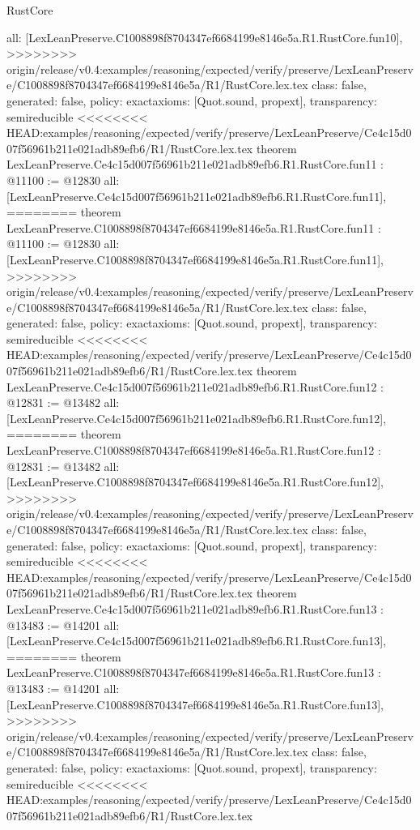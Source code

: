 \begin{lexlean}{RustCore}
\begin{coremodule}
{\begin{coremodule}
{{{{{{{{{{{{{{  all: [LexLeanPreserve.C1008898f8704347ef6684199e8146e5a.R1.RustCore.fun10],
>>>>>>>> origin/release/v0.4:examples/reasoning/expected/verify/preserve/LexLeanPreserve/C1008898f8704347ef6684199e8146e5a/R1/RustCore.lex.tex
  class: false,
  generated: false,
  policy: exact{axioms: [Quot.sound, propext]},
  transparency: semireducible
}
<<<<<<<< HEAD:examples/reasoning/expected/verify/preserve/LexLeanPreserve/Ce4c15d007f56961b211e021adb89efb6/R1/RustCore.lex.tex
theorem LexLeanPreserve.Ce4c15d007f56961b211e021adb89efb6.R1.RustCore.fun11 : @11100 := @12830 {
  all: [LexLeanPreserve.Ce4c15d007f56961b211e021adb89efb6.R1.RustCore.fun11],
========
theorem LexLeanPreserve.C1008898f8704347ef6684199e8146e5a.R1.RustCore.fun11 : @11100 := @12830 {
  all: [LexLeanPreserve.C1008898f8704347ef6684199e8146e5a.R1.RustCore.fun11],
>>>>>>>> origin/release/v0.4:examples/reasoning/expected/verify/preserve/LexLeanPreserve/C1008898f8704347ef6684199e8146e5a/R1/RustCore.lex.tex
  class: false,
  generated: false,
  policy: exact{axioms: [Quot.sound, propext]},
  transparency: semireducible
}
<<<<<<<< HEAD:examples/reasoning/expected/verify/preserve/LexLeanPreserve/Ce4c15d007f56961b211e021adb89efb6/R1/RustCore.lex.tex
theorem LexLeanPreserve.Ce4c15d007f56961b211e021adb89efb6.R1.RustCore.fun12 : @12831 := @13482 {
  all: [LexLeanPreserve.Ce4c15d007f56961b211e021adb89efb6.R1.RustCore.fun12],
========
theorem LexLeanPreserve.C1008898f8704347ef6684199e8146e5a.R1.RustCore.fun12 : @12831 := @13482 {
  all: [LexLeanPreserve.C1008898f8704347ef6684199e8146e5a.R1.RustCore.fun12],
>>>>>>>> origin/release/v0.4:examples/reasoning/expected/verify/preserve/LexLeanPreserve/C1008898f8704347ef6684199e8146e5a/R1/RustCore.lex.tex
  class: false,
  generated: false,
  policy: exact{axioms: [Quot.sound, propext]},
  transparency: semireducible
}
<<<<<<<< HEAD:examples/reasoning/expected/verify/preserve/LexLeanPreserve/Ce4c15d007f56961b211e021adb89efb6/R1/RustCore.lex.tex
theorem LexLeanPreserve.Ce4c15d007f56961b211e021adb89efb6.R1.RustCore.fun13 : @13483 := @14201 {
  all: [LexLeanPreserve.Ce4c15d007f56961b211e021adb89efb6.R1.RustCore.fun13],
========
theorem LexLeanPreserve.C1008898f8704347ef6684199e8146e5a.R1.RustCore.fun13 : @13483 := @14201 {
  all: [LexLeanPreserve.C1008898f8704347ef6684199e8146e5a.R1.RustCore.fun13],
>>>>>>>> origin/release/v0.4:examples/reasoning/expected/verify/preserve/LexLeanPreserve/C1008898f8704347ef6684199e8146e5a/R1/RustCore.lex.tex
  class: false,
  generated: false,
  policy: exact{axioms: [Quot.sound, propext]},
  transparency: semireducible
}
<<<<<<<< HEAD:examples/reasoning/expected/verify/preserve/LexLeanPreserve/Ce4c15d007f56961b211e021adb89efb6/R1/RustCore.lex.tex
}}}}}}}}}}}}}}}}
\end{coremodule}}
\end{coremodule}
\end{lexlean}

